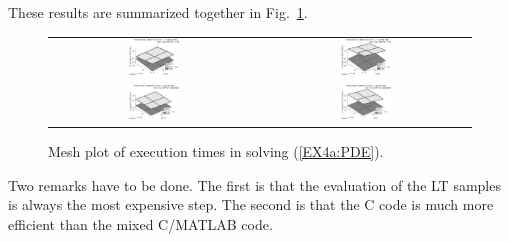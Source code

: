 \documentclass[a4paper,10pt]{report}%
\begin{document}
These results are summarized together in Fig.~\ref{EX4a_times3D_tol4}.
\begin{figure}[htb]
\centering
\begin{tabular}{cc}
\includegraphics[width=0.25\textwidth]{./FIGS/EX4a/EX4a_times3D_tol4_1.eps} &
\includegraphics[width=0.25\textwidth]{./FIGS/EX4a/EX4a_times3D_tol4_3.eps} \\
\includegraphics[width=0.25\textwidth]{./FIGS/EX4a/EX4a_times3D_tol4_2.eps} &
\includegraphics[width=0.25\textwidth]{./FIGS/EX4a/EX4a_times3D_tol4_4.eps}
\end{tabular}
\caption{\small Mesh plot of execution times in solving (\ref{EX4a:PDE}).}
\label{EX4a_times3D_tol4}
\end{figure}

\newpage
\noindent Two remarks have to be done.
The first is that the evaluation of the LT samples is always the most expensive step.
The second is that the C code is much more efficient than the mixed C/MATLAB code.



\end{document}
